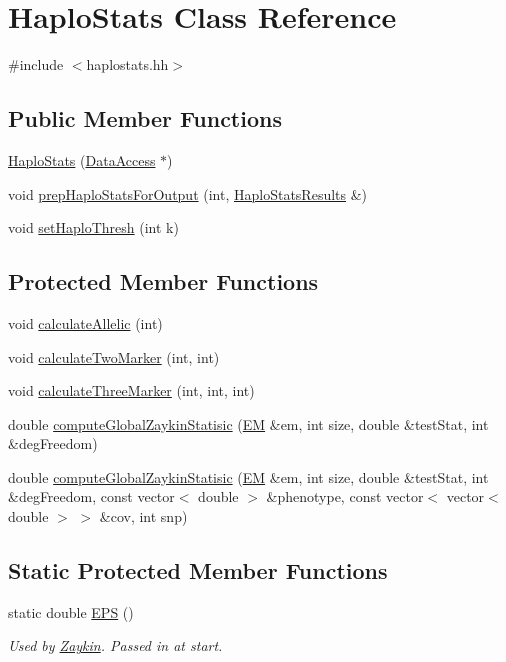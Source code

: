 \hypertarget{classHaploStats}{
\section{HaploStats Class Reference}
\label{classHaploStats}
}


{\ttfamily \#include $<$haplostats.hh$>$}

\subsection*{Public Member Functions}
\begin{DoxyCompactItemize}
\item 
\hyperlink{classHaploStats_ada2d93862b794d80fe0903410689234e}{HaploStats} (\hyperlink{classDataAccess}{DataAccess} $\ast$)
\item 
void \hyperlink{classHaploStats_a2e17c8ccd68b20b4a2cb20e91025c13e}{prepHaploStatsForOutput} (int, \hyperlink{structHaploStatsResults}{HaploStatsResults} \&)
\item 
void \hyperlink{classHaploStats_a5f5c2445d79a7913381ff0ac5d8f53d4}{setHaploThresh} (int k)
\end{DoxyCompactItemize}
\subsection*{Protected Member Functions}
\begin{DoxyCompactItemize}
\item 
void \hyperlink{classHaploStats_ae7c212db625f88424070abcc364ed89f}{calculateAllelic} (int)
\item 
void \hyperlink{classHaploStats_a4eb4a1554f92c356d3d6bcb3f15a4daf}{calculateTwoMarker} (int, int)
\item 
void \hyperlink{classHaploStats_af2525446b1f48c377adeffd328c53cba}{calculateThreeMarker} (int, int, int)
\item 
double \hyperlink{classHaploStats_a8f9a2f53316b3e76f350dbd68589ccb0}{computeGlobalZaykinStatisic} (\hyperlink{classEM}{EM} \&em, int size, double \&testStat, int \&degFreedom)
\item 
double \hyperlink{classHaploStats_a25999dcaac8dabc7a4c10a0992db61fb}{computeGlobalZaykinStatisic} (\hyperlink{classEM}{EM} \&em, int size, double \&testStat, int \&degFreedom, const vector$<$ double $>$ \&phenotype, const vector$<$ vector$<$ double $>$ $>$ \&cov, int snp)
\end{DoxyCompactItemize}
\subsection*{Static Protected Member Functions}
\begin{DoxyCompactItemize}
\item 
static double \hyperlink{classHaploStats_ad2719f7191d458bf72cf117b0d581aaa}{EPS} ()
\begin{DoxyCompactList}\small\item\em Used by \hyperlink{classZaykin}{Zaykin}. Passed in at start. \item\end{DoxyCompactList}\end{DoxyCompactItemize}
